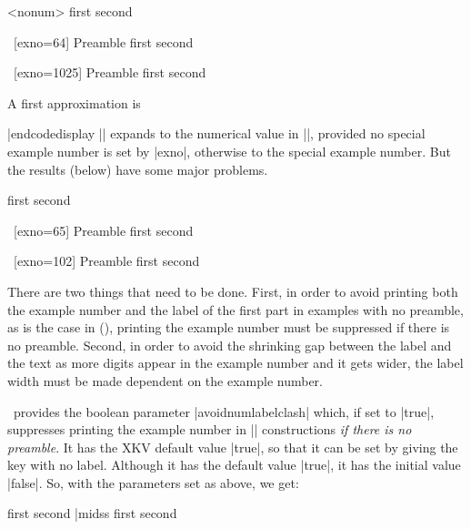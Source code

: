 %
\begingroup

\pex[exno=4]<nonum>
\a first
\a second
\xe

\pex~[exno=64]
Preamble
\a first
\a second
\xe

\pex~[exno=1025]
Preamble
\a first
\a second
\xe
\endgroup

A first approximation is

\codedisplay
{}
|endcodedisplay
|\actualexno| expands to the numerical value in |\excnt|, provided
no special example number is set by |exno|, otherwise to the
special example number. But the results (below) have some
major problems.

\begingroup
{}
\pex[exno=5]
\a first
\a second
\xe

\pex~[exno=65]
Preamble
\a first
\a second
\xe

\pex~[exno=102]
Preamble
\a first
\a second
\xe

There are two things that need to be done.  First, in order to
avoid printing both the example number and the label of the first
part in examples with no preamble, as is the case in
(), printing the example number must be suppressed
if there is no preamble. Second, in order to avoid the shrinking
gap between the label and the text as more digits appear in the
example number and it gets wider, the label width must be made
dependent on the example number.

\ExPex\ provides the boolean parameter |avoidnumlabelclash|
which, if set to |true|, suppresses printing the example number
in |\pex| constructions {\it if there is no preamble}.  It has
the XKV default value |true|, so that it can be set by giving the
key with no label.  Although it has the default value |true|, it
has the initial value |false|.  So, with the parameters set as
above, we get:

\beginss
\pex[exno=5,avoidnumlabelclash]
\a first
\a second
\xe|midss
\pex[exno=5,avoidnumlabelclash]
\a first
\a second
\xe
\endss

